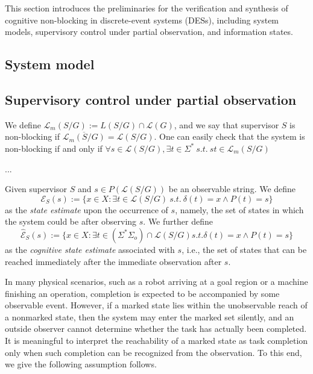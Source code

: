 \documentclass{article}
\begin{document}
This section introduces the preliminaries for the verification and synthesis of cognitive non-blocking in discrete-event systems (DESs), including system models, supervisory control under partial observation, and information states.


\subsection{System model}

\subsection{Supervisory control under partial observation}

We define $\mathcal{L}_m (S/G) := L(S/G) \cap \mathcal{L}(G)$, and
we say that supervisor $S$ is non-blocking if $\overline{\mathcal{L}_m(S/G)} = \mathcal{L}(S/G)$.
One can easily check that the system is non-blocking if and only if 
$\forall s \in \mathcal{L}(S/G), \exists t \in \Sigma^* \ s.t. \ st \in \mathcal{L}_m(S/G)$

...

Given supervisor $S$ and $s \in P(\mathcal{L}(S/G))$ be an observable
string. We define
$$
\mathcal{E}_S(s) := \{x \in X : \exists t \in \mathcal{L}(S/G) \ s.t. \ \delta(t) = x \wedge P(t) = s\}
$$
as the \emph{state estimate} upon the occurrence of $s$, namely, the set of states in which the system could be after observing $s$.
We further define
$$
\hat{\mathcal{E}}_S(s) := \{x \in X : \exists t \in (\Sigma^*\Sigma_o) \cap \mathcal{L}(S/G) s.t. \delta(t) = x \wedge P(t) = s\}
$$
as the \emph{cognitive state estimate} associated with $s$, i.e., the set of states that can be reached immediately after the immediate observation after $s$.

In many physical scenarios, such as a robot arriving at a goal region or a machine finishing an operation, completion is expected to be accompanied by some observable event.
However, if a marked state lies within the unobservable reach of a nonmarked state, then the system may enter the marked set silently, and an outside observer cannot determine whether the task has actually been completed.
It is meaningful to interpret the reachability of a marked state as task completion only when such completion can be recognized from the observation.
To this end, we give the following assumption follows.
\end{document}
